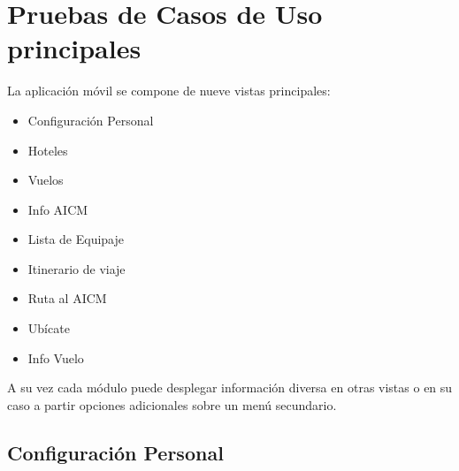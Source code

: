 \section{Pruebas de Casos de Uso principales}
La aplicación móvil se compone de nueve vistas principales:
\begin{itemize}
 \item Configuración Personal
 \item Hoteles
 \item Vuelos
 \item Info AICM
 \item Lista de Equipaje
 \item Itinerario de viaje
 \item Ruta al AICM
 \item Ubícate
 \item Info Vuelo
\end{itemize}

A su vez cada módulo puede desplegar información diversa en otras vistas o en su caso a partir opciones adicionales sobre un menú 
secundario.
\subsection{Configuración Personal}


